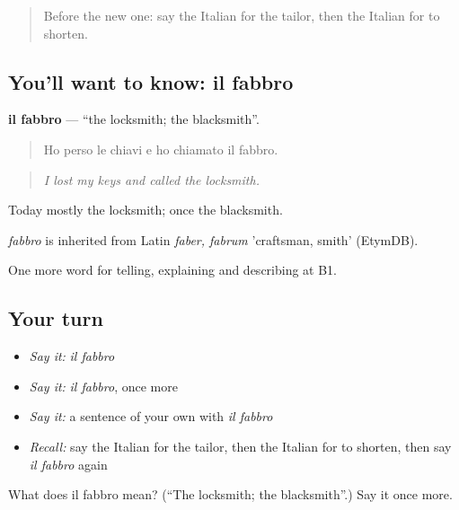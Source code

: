 \label{lesson:IT-C455-fabbro}



\begin{quote}
Before the new one: say the Italian for the tailor, then the Italian for to shorten.
\end{quote}

\subsection*{You'll want to know: il fabbro}
\textbf{il fabbro} — \textquotedblleft{}the locksmith; the blacksmith\textquotedblright{}.

\begin{quote}
Ho perso le chiavi e ho chiamato il fabbro.
\end{quote}

\begin{quote}
\emph{I lost my keys and called the locksmith.}
\end{quote}

Today mostly the locksmith; once the blacksmith.

\begin{cousinweb}
\emph{fabbro} is inherited from Latin \emph{faber, fabrum} 'craftsman, smith' (EtymDB).
\end{cousinweb}

\begin{grammarlens}[title={What you've built}]
One more word for telling, explaining and describing at B1.
\end{grammarlens}

\subsection*{Your turn}
\begin{itemize}
\raggedright
  \item \emph{Say it:} \emph{il fabbro}
  \item \emph{Say it:} \emph{il fabbro}, once more
  \item \emph{Say it:} a sentence of your own with \emph{il fabbro}
  \item \emph{Recall:} say the Italian for the tailor, then the Italian for to shorten, then say \emph{il fabbro} again
\end{itemize}

\begin{tcolorbox}[breakable,colback=teal!4,colframe=teal!35!black,title={Before you move on}]
What does il fabbro mean? (\textquotedblleft{}The locksmith; the blacksmith\textquotedblright{}.) Say it once more.
\end{tcolorbox}
